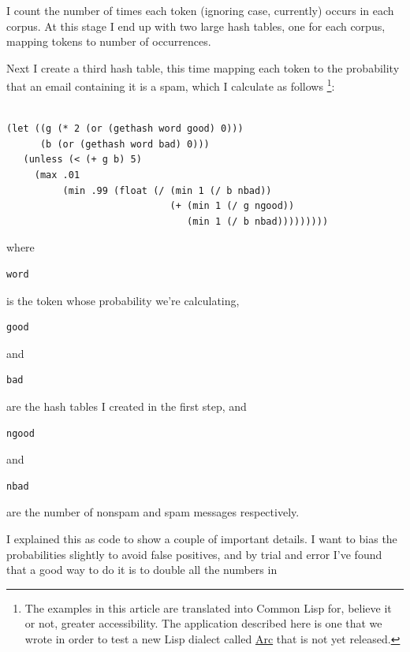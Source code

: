 \documentclass[12pt]{book}
\begin{document}
I count the number of times each token (ignoring case, currently) occurs
in each corpus. At this stage I end up with two large hash tables, one
for each corpus, mapping tokens to number of occurrences.

Next I create a third hash table, this time mapping each token to the
probability that an email containing it is a spam, which I calculate as
follows \footnote{The examples in this article are translated into Common Lisp
for, believe it or not, greater accessibility. The application described
here is one that we wrote in order to test a new Lisp dialect called
\href{arc.html}{Arc} that is not yet released.}:

\begin{verbatim}

(let ((g (* 2 (or (gethash word good) 0)))
      (b (or (gethash word bad) 0)))
   (unless (< (+ g b) 5)
     (max .01
          (min .99 (float (/ (min 1 (/ b nbad))
                             (+ (min 1 (/ g ngood))   
                                (min 1 (/ b nbad)))))))))
\end{verbatim}

where

\begin{verbatim}
word
\end{verbatim}

is the token whose probability we're calculating,

\begin{verbatim}
good
\end{verbatim}

and

\begin{verbatim}
bad
\end{verbatim}

are the hash tables I created in the first step, and

\begin{verbatim}
ngood
\end{verbatim}

and

\begin{verbatim}
nbad
\end{verbatim}

are the number of nonspam and spam messages respectively.

I explained this as code to show a couple of important details. I want
to bias the probabilities slightly to avoid false positives, and by
trial and error I've found that a good way to do it is to double all the
numbers in
\end{document}
